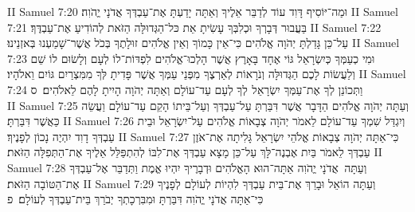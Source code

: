II Samuel 7:20	וּמַה־יּוֹסִיף דָּוִד עוֹד לְדַבֵּר אֵלֶיךָ וְאַתָּה יָדַעְתָּ אֶת־עַבְדְּךָ אֲדֹנָי יֱהֹוִה׃
II Samuel 7:21	בַּעֲבוּר דְּבָרְךָ וּכְלִבְּךָ עָשִׂיתָ אֵת כּל־הַגְּדוּלָּה הַזֹּאת לְהוֹדִיעַ אֶת־עַבְדֶּךָ׃
II Samuel 7:22	עַל־כֵּן גָּדַלְתָּ יְהֹוָה אֱלֹהִים כִּי־אֵין כָּמוֹךָ וְאֵין אֱלֹהִים זוּלָתֶךָ בְּכֹל אֲשֶׁר־שָׁמַעְנוּ בְּאזְנֵינוּ׃
II Samuel 7:23	וּמִי כְעַמְּךָ כְּיִשְׂרָאֵל גּוֹי אֶחָד בָּאָרֶץ אֲשֶׁר הָלְכוּ־אֱלֹהִים לִפְדּוֹת־לוֹ לְעָם וְלָשׂוּם לוֹ שֵׁם וְלַעֲשׂוֹת לָכֶם הַגְּדוּלָּה וְנֹרָאוֹת לְאַרְצֶךָ מִפְּנֵי עַמְּךָ אֲשֶׁר פָּדִיתָ לְּךָ מִמִּצְרַיִם גּוֹיִם וֵאלֹהָיו׃
II Samuel 7:24	וַתְּכוֹנֵן לְךָ אֶת־עַמְּךָ יִשְׂרָאֵל  לְךָ לְעָם עַד־עוֹלָם וְאַתָּה יְהֹוָה הָיִיתָ לָהֶם לֵאלֹהִים׃ {ס}        
II Samuel 7:25	וְעַתָּה יְהֹוָה אֱלֹהִים הַדָּבָר אֲשֶׁר דִּבַּרְתָּ עַל־עַבְדְּךָ וְעַל־בֵּיתוֹ הָקֵם עַד־עוֹלָם וַעֲשֵׂה כַּאֲשֶׁר דִּבַּרְתָּ׃
II Samuel 7:26	וְיִגְדַּל שִׁמְךָ עַד־עוֹלָם לֵאמֹר יְהֹוָה צְבָאוֹת אֱלֹהִים עַל־יִשְׂרָאֵל וּבֵית עַבְדְּךָ דָוִד יִהְיֶה נָכוֹן לְפָנֶיךָ׃
II Samuel 7:27	כִּי־אַתָּה יְהֹוָה צְבָאוֹת אֱלֹהֵי יִשְׂרָאֵל גָּלִיתָה אֶת־אֹזֶן עַבְדְּךָ לֵאמֹר בַּיִת אֶבְנֶה־לָּךְ עַל־כֵּן מָצָא עַבְדְּךָ אֶת־לִבּוֹ לְהִתְפַּלֵּל אֵלֶיךָ אֶת־הַתְּפִלָּה הַזֹּאת׃
II Samuel 7:28	וְעַתָּה  אֲדֹנָי יֱהֹוִה אַתָּה־הוּא הָאֱלֹהִים וּדְבָרֶיךָ יִהְיוּ אֱמֶת וַתְּדַבֵּר אֶל־עַבְדְּךָ אֶת־הַטּוֹבָה הַזֹּאת׃
II Samuel 7:29	וְעַתָּה הוֹאֵל וּבָרֵךְ אֶת־בֵּית עַבְדְּךָ לִהְיוֹת לְעוֹלָם לְפָנֶיךָ כִּי־אַתָּה אֲדֹנָי יֱהֹוִה דִּבַּרְתָּ וּמִבִּרְכָתְךָ יְבֹרַךְ בֵּית־עַבְדְּךָ לְעוֹלָם׃ {פ}
